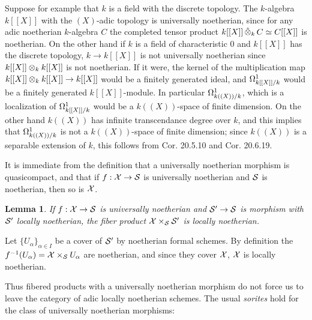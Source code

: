 \documentclass{article}
\theoremstyle{change}
\newtheorem{lemma}[subsubsection]{Lemma}
\numberwithin{equation}{subsubsection}
\newcommand{\demobox}{\vrule height6pt width6pt depth0pt}
\newenvironment{demo}{\noindent{\it Proof.}}
{{\unskip\nobreak\hfil\qquad
\demobox\parfillskip=0pt\par}
\medskip}
\begin{document}
Suppose for example that $k$ is a field with the discrete topology.
The $k$-algebra $k[[X]]$ with the $(X)$-adic topology is universally
noetherian, since for any adic noetherian $k$-algebra $C$ the
completed tensor product $k[[X]]\mathop{\hat\otimes}_kC\simeq C[[X]]$ is
noetherian. On the other hand if $k$ is a field of characteristic $0$
and $k[[X]]$ has the discrete topology, $k\to k[[X]]$ is not
universally noetherian since $k[[X]]\otimes_kk[[X]]$ is not
noetherian. If it were, the kernel of the multiplication map
$k[[X]]\otimes_kk[[X]]\to k[[X]]$ would be a finitely generated ideal,
and $\Omega^1_{k[[X]]/k}$ would be a finitely generated
$k[[X]]$-module. In particular $\Omega^1_{k((X))/k}$, which is a
localization of $\Omega^1_{k[[X]]/k}$ would be a $k((X))$-space of finite
dimension. On the other hand $k((X))$ has infinite transcendance
degree over $k$, and this implies that $\Omega^1_{k((X))/k}$ is not a
$k((X))$-space of finite dimension; since $k((X))$ is a separable
extension of $k$, this follows from \cite[$0_{IV}$]{EGA} Cor. 20.5.10
and Cor. 20.6.19.

It is immediate from the definition that a universally noetherian
morphism is quasicompact, and that if $f:{\cal X}\to{\cal S}$ is universally
noetherian and ${\cal S}$ is noetherian, then so is ${\cal X}$. 

\begin{lemma}
  If $f:{\cal X}\to{\cal S}$ is universally noetherian and ${\cal S}'\to{\cal S}$ is morphism with
  ${\cal S}'$ locally noetherian, the fiber product ${\cal X}\times_{\cal S}{\cal S}'$ is
  locally noetherian.
\end{lemma}
\begin{demo}
  Let $\{U_\alpha\}_{\alpha\in I}$ be a cover of ${\cal S}'$ by noetherian
  formal schemes. By definition the
  $f^{-1}(U_\alpha)={\cal X}\times_{\cal S} U_\alpha$ are noetherian, and since
  they cover ${\cal X}$, ${\cal X}$ is locally noetherian.
\end{demo}

Thus fibered products with a universally noetherian morphism do not
force us to leave the category of adic locally noetherian schemes.
The usual \textit{sorites} hold for the class of universally
noetherian morphisms:
\end{document}
